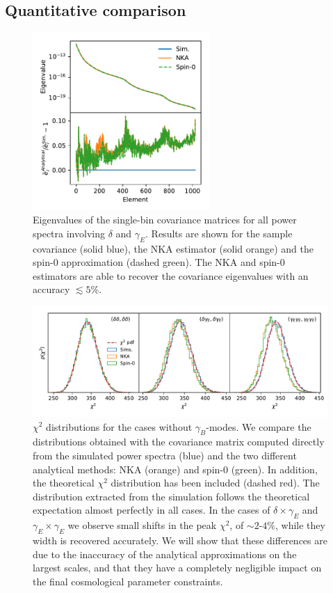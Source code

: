 \documentclass[a4paper,11pt]{article}
\begin{document}
    \subsection{Quantitative comparison}\label{ssec:results.quant}
      \begin{figure}
        \centering
        \includegraphics[width=0.6\textwidth]{./figures/run_sph_2b_NKA_TTTEEE_reldev_eigval_1stbin.pdf}
        \caption{Eigenvalues of the single-bin covariance matrices for all power spectra involving $\delta$ and $\gamma_E$. Results are shown for the sample covariance (solid blue), the NKA estimator (solid orange) and the spin-0 approximation (dashed green). The NKA and spin-0 estimators are able to recover the covariance eigenvalues with an accuracy $\lesssim5\%$.} \label{fig:eigv_1bin}
      \end{figure}
      \begin{figure}
        \centering
        \includegraphics[width=\textwidth]{./figures/run_sph_2b_1stbin_chi2_TT_TE_EE.pdf}
        \caption{$\chi^2$ distributions for the cases without $\gamma_B$-modes. We compare the distributions obtained with the covariance matrix computed directly from the simulated power spectra (blue) and the two different analytical methods: NKA (orange) and spin-0 (green). In addition, the theoretical $\chi^2$ distribution has been included (dashed red). The distribution extracted from the simulation follows the theoretical expectation almost perfectly in all cases. In the cases of $\delta\times\gamma_E$ and $\gamma_E\times\gamma_E$ we observe small shifts in the peak $\chi^2$, of $\sim2$-$4\%$, while they width is recovered accurately. We will show that these differences are due to the inaccuracy of the analytical approximations on the largest scales, and that they have a completely negligible impact on the final cosmological parameter constraints.}
        \label{fig:chi2_1bin} \end{figure}
\end{document}
